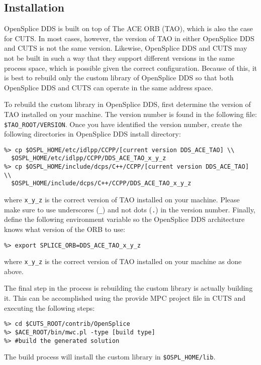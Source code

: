 \subsection{Installation}

OpenSplice DDS is built on top of The ACE ORB (TAO), which is also the
case for CUTS. In most cases, however, the version of TAO in either 
OpenSplice DDS and CUTS is not the same version. Likewise, OpenSplice DDS
and CUTS may not be built in such a way that they support different 
versions in the same process space, which is possible given the correct
configuration. Because of this, it is best to rebuild only the custom
library of OpenSplice DDS so that both OpenSplice DDS and CUTS can operate 
in the same address space. 

To rebuild the custom library in OpenSplice DDS, first determine
the version of TAO installed on your machine. The version number is
found in the following file: \texttt{\$TAO\_ROOT/VERSION}. Once you
have identified the version number, create the following directories
in OpenSplice DDS install directory:
\begin{lstlisting}
%> cp $OSPL_HOME/etc/idlpp/CCPP/[current version DDS_ACE_TAO] \\
  $OSPL_HOME/etc/idlpp/CCPP/DDS_ACE_TAO_x_y_z
%> cp $OSPL_HOME/include/dcps/C++/CCPP/[current version DDS_ACE_TAO] \\
  $OSPL_HOME/include/dcps/C++/CCPP/DDS_ACE_TAO_x_y_z
\end{lstlisting}
where \texttt{x\_y\_z} is the correct version of TAO installed on your 
machine. Please make sure to use underscores (\texttt{\_}) and not 
dots (\texttt{.}) in the version number. Finally, define the following 
environment variable so the OpenSplice DDS architecture knows what 
version of the ORB to use:
\begin{lstlisting}
%> export SPLICE_ORB=DDS_ACE_TAO_x_y_z
\end{lstlisting}
where \texttt{x\_y\_z} is the correct version of TAO installed on 
your machine as done above.

The final step in the process is rebuilding the custom library is
actually building it. This can be accomplished using the provide
MPC project file in CUTS and executing the following steps: 
\begin{lstlisting}
%> cd $CUTS_ROOT/contrib/OpenSplice
%> $ACE_ROOT/bin/mwc.pl -type [build type]
%> #build the generated solution
\end{lstlisting}

The build process will install the custom library in 
\texttt{\$OSPL\_HOME/lib}.

